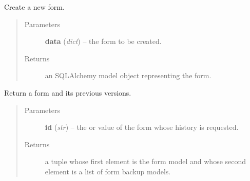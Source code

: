 \documentclass[letterpaper,10pt,english]{sphinxmanual}
\begin{document}
\begin{fulllineitems}
\label{api:onlinelinguisticdatabase.controllers.forms.createNewForm}
Create a new form.
\begin{quote}\begin{description}
\item[{Parameters}] \leavevmode
\textbf{data} (\emph{dict}) -- the form to be created.

\item[{Returns}] \leavevmode
an SQLAlchemy model object representing the form.

\end{description}\end{quote}

\end{fulllineitems}


\begin{fulllineitems}
\label{api:onlinelinguisticdatabase.controllers.forms.getFormAndPreviousVersions}
Return a form and its previous versions.
\begin{quote}\begin{description}
\item[{Parameters}] \leavevmode
\textbf{id} (\emph{str}) -- the  or  value of the form whose history is
requested.

\item[{Returns}] \leavevmode
a tuple whose first element is the form model and whose second
element is a list of form backup models.

\end{description}\end{quote}

\end{fulllineitems}

\end{document}
